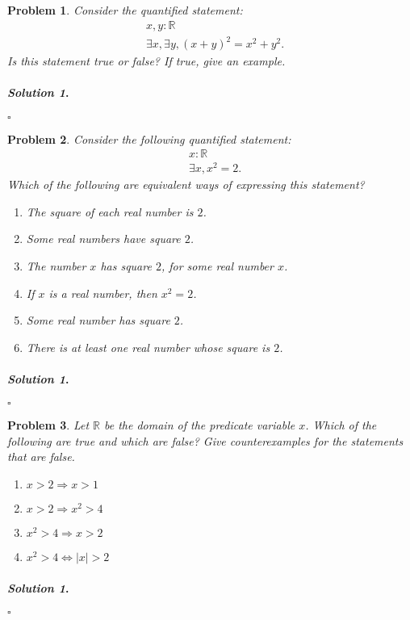 \documentclass{amsart}
\theoremstyle{plain}
\newtheorem{problem}{Problem}
\newenvironment{solution}{\paragraph{\emph{Solution 1}.}}{\hfill$\square$}
\begin{document}
\begin{problem}
Consider the quantified statement:
\begin{equation*}
\begin{aligned}
&x,y : \mathbb{R}\\
&\exists x,\exists y, (x + y)^2 = x^2 + y^2.
\end{aligned}
\end{equation*}
Is this statement true or false?  If true, give an example.
\end{problem}

\begin{solution}

\end{solution}

\begin{problem}
Consider the following quantified statement:
\begin{equation*}
\begin{aligned}
&x : \mathbb{R}\\
&\exists x, x^{2} = 2.
\end{aligned}
\end{equation*}
Which of the following are equivalent ways of expressing this statement?
\begin{enumerate}
\item The square of each real number is $2$.
\item Some real numbers have square $2$.
\item The number $x$ has square $2$, for some real number $x$.
\item If $x$ is a real number, then $x^{2} = 2$.
\item Some real number has square $2$.
\item There is at least one real number whose square is $2$.
\end{enumerate}
\end{problem}

\begin{solution}

\end{solution}


\begin{problem}
Let $\mathbb{R}$ be the domain of the predicate variable $x$.  Which of the following are true and which are false?  Give counterexamples for the statements that are false.
\begin{enumerate}
\item $x > 2 \Rightarrow x > 1$
\item $x > 2 \Rightarrow x^{2} > 4$
\item $x^{2} > 4 \Rightarrow x > 2$
\item $x^{2}>4 \Leftrightarrow |x| > 2$
\end{enumerate}
\end{problem}

\begin{solution}

\end{solution}
\end{document}
